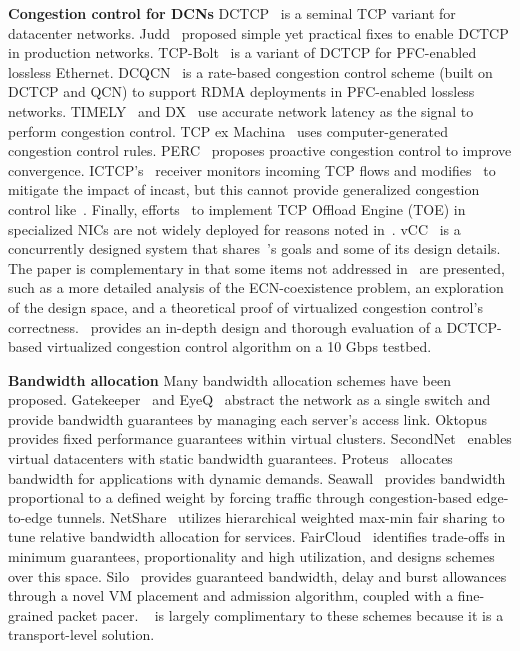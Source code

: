 {\bf Congestion control for DCNs}
DCTCP~\cite{alizadeh2011data} is a seminal TCP variant for datacenter networks.
Judd~\cite{judd2015nsdi} proposed simple yet practical fixes to enable DCTCP in production networks.
TCP-Bolt~\cite{stephens2014practical} is a variant of DCTCP for PFC-enabled lossless Ethernet.
DCQCN~\cite{zhu2015congestion} is a rate-based congestion control scheme (built on DCTCP and QCN) to
support RDMA deployments in PFC-enabled lossless networks.
TIMELY~\cite{mittal2015timely} and DX~\cite{lee2015accurate}
use accurate network latency as the signal to perform congestion control.
TCP ex Machina~\cite{winstein2013tcp} uses computer-generated congestion control rules.
PERC~\cite{jose2015high} proposes proactive congestion control to improve convergence.
ICTCP's~\cite{wu2010ictcp} receiver monitors incoming TCP flows and
modifies~\rwnd{} to mitigate the impact of incast, but this cannot
provide generalized congestion control like~\acdc{}.
Finally, efforts~\cite{dell-toe,chelsio-toe} to
implement TCP Offload Engine (TOE) in specialized NICs are not widely deployed for reasons noted in~\cite{mogul2003tcp,linux-toe}.
vCC~\cite{vcc} is a concurrently designed system that shares~\acdc{}'s goals and some of its design details.
The paper is complementary in that some items not addressed in~\acdc{} are presented, such as a more detailed
analysis of the ECN-coexistence problem, an exploration of the design space, and a theoretical proof of
virtualized congestion control's correctness.~\acdc{} provides an in-depth design and thorough evaluation of
a DCTCP-based virtualized congestion control algorithm on a 10 Gbps testbed.


{\bf Bandwidth allocation} Many bandwidth allocation schemes have been proposed.
Gatekeeper~\cite{rodrigues2011gatekeeper} and EyeQ~\cite{jeyakumar2013eyeq} abstract the network as a single
switch and provide bandwidth guarantees by managing each server's access link.
Oktopus~\cite{Ballani2011oktopus} provides fixed performance guarantees within virtual clusters.
SecondNet~\cite{Guo2010Secondnet} enables virtual datacenters with static bandwidth guarantees.
Proteus~\cite{Xie2012Proteus} allocates bandwidth for applications with dynamic demands.
Seawall~\cite{shieh2011sharing} provides bandwidth proportional to a defined weight by
forcing traffic through congestion-based edge-to-edge tunnels.
NetShare~\cite{Lam2012NetShare} utilizes hierarchical weighted max-min fair sharing to tune relative bandwidth allocation for services.
FairCloud~\cite{Popa2012Faircloud} identifies trade-offs in minimum
guarantees, proportionality and high utilization, and designs schemes over this space.
Silo~\cite{jang2015silo} provides guaranteed bandwidth, delay and burst allowances through a novel VM placement and admission
algorithm, coupled with a fine-grained packet pacer. 
~\acdc{} is largely complimentary to these schemes because it is a transport-level solution.

